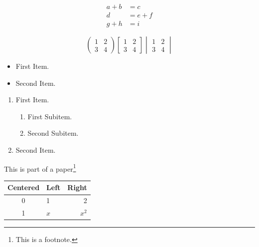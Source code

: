 \documentclass[12pt]{article}
\begin{document}
\begin{align*}
a + b &= c\\
	d &= e + f \nonumber\\
g + h &= i
\end{align*}

\begin{equation*}
\begin{pmatrix}
1 & 2\\
3 & 4
\end{pmatrix}
\begin{bmatrix}
1 & 2\\
3 & 4
\end{bmatrix}
\begin{vmatrix}
1 & 2\\
3 & 4
\end{vmatrix}
\end{equation*}

\begin{itemize}
\item First Item.
\item Second Item.
\end{itemize}

\begin{enumerate}
\item First Item.
	\begin{enumerate}
	\item First Subitem.
	\item Second Subitem.
	\end{enumerate}
\item Second Item.
\end{enumerate}

This is part of
a paper\footnote{This is a footnote.}

\begin{tabular}{|c|lr|}
\hline
Centered & Left & Right \\
\hline
0 & 1 & 2\\
1 & $x$ & $x^2$\\
\hline
\end{tabular}
\end{document}
